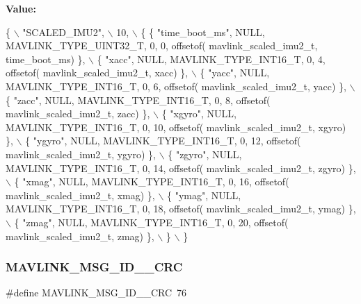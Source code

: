 {\bfseries Value\+:}
\begin{DoxyCode}
\{ \(\backslash\)
    \textcolor{stringliteral}{"SCALED\_IMU2"}, \(\backslash\)
    10, \(\backslash\)
    \{  \{ \textcolor{stringliteral}{"time\_boot\_ms"}, NULL, MAVLINK_TYPE_UINT32_T, 0, 0, offsetof(
      mavlink_scaled_imu2_t, time\_boot\_ms) \}, \(\backslash\)
         \{ \textcolor{stringliteral}{"xacc"}, NULL, MAVLINK_TYPE_INT16_T, 0, 4, offsetof(
      mavlink_scaled_imu2_t, xacc) \}, \(\backslash\)
         \{ \textcolor{stringliteral}{"yacc"}, NULL, MAVLINK_TYPE_INT16_T, 0, 6, offsetof(
      mavlink_scaled_imu2_t, yacc) \}, \(\backslash\)
         \{ \textcolor{stringliteral}{"zacc"}, NULL, MAVLINK_TYPE_INT16_T, 0, 8, offsetof(
      mavlink_scaled_imu2_t, zacc) \}, \(\backslash\)
         \{ \textcolor{stringliteral}{"xgyro"}, NULL, MAVLINK_TYPE_INT16_T, 0, 10, offsetof(
      mavlink_scaled_imu2_t, xgyro) \}, \(\backslash\)
         \{ \textcolor{stringliteral}{"ygyro"}, NULL, MAVLINK_TYPE_INT16_T, 0, 12, offsetof(
      mavlink_scaled_imu2_t, ygyro) \}, \(\backslash\)
         \{ \textcolor{stringliteral}{"zgyro"}, NULL, MAVLINK_TYPE_INT16_T, 0, 14, offsetof(
      mavlink_scaled_imu2_t, zgyro) \}, \(\backslash\)
         \{ \textcolor{stringliteral}{"xmag"}, NULL, MAVLINK_TYPE_INT16_T, 0, 16, offsetof(
      mavlink_scaled_imu2_t, xmag) \}, \(\backslash\)
         \{ \textcolor{stringliteral}{"ymag"}, NULL, MAVLINK_TYPE_INT16_T, 0, 18, offsetof(
      mavlink_scaled_imu2_t, ymag) \}, \(\backslash\)
         \{ \textcolor{stringliteral}{"zmag"}, NULL, MAVLINK_TYPE_INT16_T, 0, 20, offsetof(
      mavlink_scaled_imu2_t, zmag) \}, \(\backslash\)
         \} \(\backslash\)
\}
\end{DoxyCode}
\mbox{\label{mavlink__msg__scaled__imu2_8h_af0edaaa6e3dd5572e60c1b70ccc9e0ab}} 
\subsubsection{M\+A\+V\+L\+I\+N\+K\+\_\+\+M\+S\+G\+\_\+\+I\+D\+\_\+\_\+\+C\+RC}
{\footnotesize\ttfamily \#define M\+A\+V\+L\+I\+N\+K\+\_\+\+M\+S\+G\+\_\+\+I\+D\+\_\+\_\+\+C\+RC~76}

